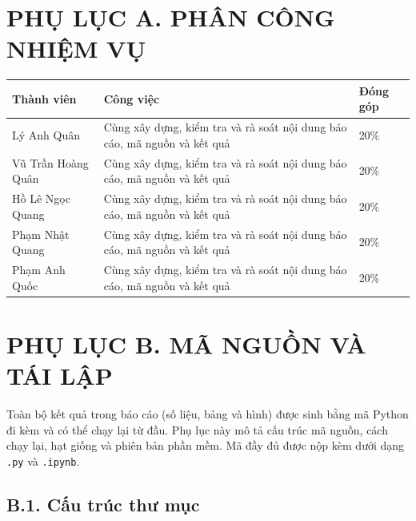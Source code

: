 \clearpage
\section*{\hypertarget{ap:A}{}PHỤ LỤC A. PHÂN CÔNG NHIỆM VỤ}

\begin{table}[H]
\centering\small
\begin{tabular}{@{}p{3.5cm}p{9.5cm}p{2.5cm}@{}}
\toprule
Thành viên & Công việc & Đóng góp \\
\midrule
Lý Anh Quân & Cùng xây dựng, kiểm tra và rà soát nội dung báo cáo, mã nguồn và kết quả & 20\% \\
Vũ Trần Hoàng Quân & Cùng xây dựng, kiểm tra và rà soát nội dung báo cáo, mã nguồn và kết quả & 20\% \\
Hồ Lê Ngọc Quang & Cùng xây dựng, kiểm tra và rà soát nội dung báo cáo, mã nguồn và kết quả & 20\% \\
Phạm Nhật Quang & Cùng xây dựng, kiểm tra và rà soát nội dung báo cáo, mã nguồn và kết quả & 20\% \\
Phạm Anh Quốc & Cùng xây dựng, kiểm tra và rà soát nội dung báo cáo, mã nguồn và kết quả & 20\% \\
\bottomrule
\end{tabular}
\end{table}

\clearpage
\section*{\hypertarget{ap:B}{}PHỤ LỤC B. MÃ NGUỒN VÀ TÁI LẬP}
\setcounter{table}{0}

Toàn bộ kết quả trong báo cáo (số liệu, bảng và hình) được sinh bằng mã Python đi kèm và có thể chạy lại từ đầu. Phụ lục này mô tả cấu trúc mã nguồn, cách chạy lại, hạt giống và phiên bản phần mềm. Mã đầy đủ được nộp kèm dưới dạng \texttt{.py} và \texttt{.ipynb}.

\subsection*{B.1. Cấu trúc thư mục}


